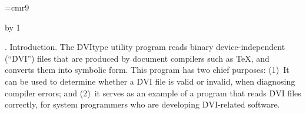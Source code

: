 

\def\hang{\hangindent 3em\indent\ignorespaces}
\font\ninerm=cmr9
\let\mc=\ninerm %
\def\PASCAL{Pascal}

\def\(#1){} %
\def\9#1{} %

\def\title{DVI$\,$\lowercase{type}}
\def\contentspagenumber{401}
\def\topofcontents{\null
  \def\titlepage{F} %
  \def\rheader{\mainfont\hfil \contentspagenumber}
  \vfill
  \centerline{\titlefont The {\ttitlefont DVItype} processor}
  \vskip 15pt
  \centerline{(Version 3.4, September 1990)}
  \vfill}
\def\botofcontents{\vfill
  \centerline{\hsize 5in\baselineskip9pt
    \vbox{\ninerm\noindent
    The preparation of this report
    was supported in part by the National Science
    Foundation under grants IST-8201926 and MCS-8300984,
    and by the System Development Foundation. `\TeX' is a
    trademark of the American Mathematical Society.}}}
\pageno=\contentspagenumber \advance\pageno by 1


.  Introduction.
The \.{DVItype} utility program reads binary device-independent (``\.{DVI}'')
files that are produced by document compilers such as \TeX, and converts them
into symbolic form. This program has two chief purposes: (1)~It can be used to
determine whether a \.{DVI} file is valid or invalid, when diagnosing
compiler errors; and (2)~it serves as an example of a program that reads
\.{DVI} files correctly, for system programmers who are developing
\.{DVI}-related software.

